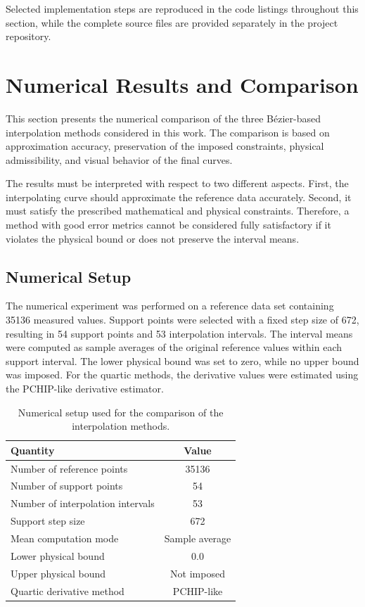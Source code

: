 \documentclass[12pt,a4paper]{article}
\begin{document}
Selected implementation steps are reproduced in the code listings throughout
this section, while the complete source files are provided separately in the
project repository.

\newpage
\section{Numerical Results and Comparison}

This section presents the numerical comparison of the three B\'ezier-based
interpolation methods considered in this work. The comparison is based on approximation accuracy, preservation
of the imposed constraints, physical admissibility, and visual behavior of the
final curves.

The results must be interpreted with respect to two different aspects. First,
the interpolating curve should approximate the reference data accurately.
Second, it must satisfy the prescribed mathematical and physical constraints.
Therefore, a method with good error metrics cannot be considered fully
satisfactory if it violates the physical bound or does not preserve the
interval means.

\subsection{Numerical Setup}

The numerical experiment was performed on a reference data set containing
35136 measured values. Support points were selected with a fixed step size of
672, resulting in 54 support points and 53 interpolation intervals. The
interval means were computed as sample averages of the original reference
values within each support interval. The lower physical bound was set to zero,
while no upper bound was imposed. For the quartic methods, the derivative
values were estimated using the PCHIP-like derivative estimator.

\begin{table}[H]
\centering
\begin{tabular}{lc}
\toprule
Quantity & Value \\
\midrule
Number of reference points & 35136 \\
Number of support points & 54 \\
Number of interpolation intervals & 53 \\
Support step size & 672 \\
Mean computation mode & Sample average \\
Lower physical bound & 0.0 \\
Upper physical bound & Not imposed \\
Quartic derivative method & PCHIP-like \\
\bottomrule
\end{tabular}
\caption{Numerical setup used for the comparison of the interpolation methods.}
\label{tab:numerical-setup}
\end{table}
\end{document}
